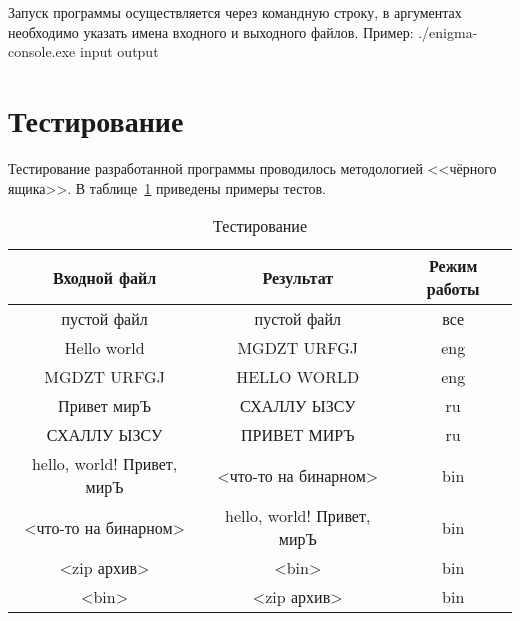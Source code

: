 \documentclass[14pt, oneside, a4paper]{extreport}
\begin{document}
Запуск программы осуществляется через командную строку, в аргументах необходимо указать имена входного и выходного файлов.
Пример: ./enigma-console.exe input output

\section{Тестирование}

Тестирование разработанной программы проводилось методологией <<чёрного ящика>>.
В таблице~\ref{table:test} приведены примеры тестов.

\begin{table}[h]
	\begin{center}
		\captionsetup{justification=raggedright,singlelinecheck=off,margin=5mm}
		\caption{Тестирование}
		\begin{tabular}{| c | c | c |}
			\hline
			Входной файл & Результат  & Режим работы\\
			\hline
			пустой файл & пустой файл & все \\
			\hline
			Hello world & MGDZT URFGJ & eng \\
			\hline
			MGDZT URFGJ & HELLO WORLD & eng \\
			\hline
			Привет мирЪ & СХАЛЛУ ЫЗСУ & ru \\
			\hline
			СХАЛЛУ ЫЗСУ & ПРИВЕТ МИРЪ & ru \\
			\hline
			hello, world! Привет, мирЪ & <что-то на бинарном> & bin \\
			\hline
			<что-то на бинарном> & hello, world! Привет, мирЪ & bin \\
			\hline
			<zip архив> & <bin> & bin \\
			\hline
			<bin> & <zip архив> & bin\\
			\hline
		\end{tabular}
		\label{table:test}
	\end{center}
\end{table}
\end{document}
